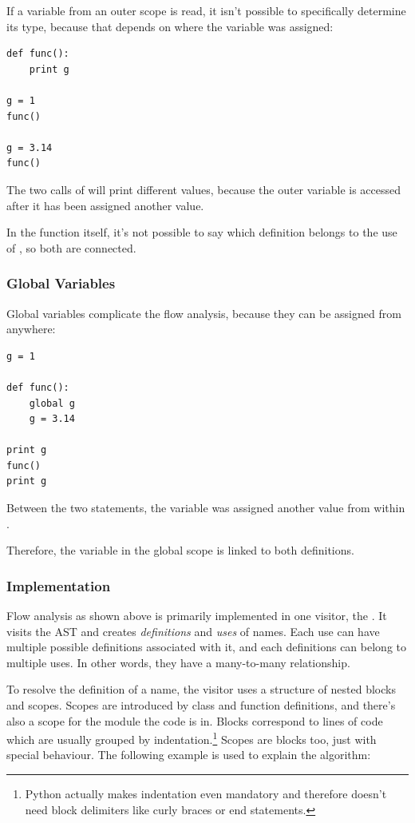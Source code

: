 \documentclass[12pt,halfparskip,DIV11,BCOR10mm]{scrreprt}
\begin{document}
If a variable from an outer scope is read, it isn't possible to specifically determine its type, because that depends on where the variable was assigned:

\begin{lstlisting}
def func():
    print g

g = 1
func()

g = 3.14
func()
\end{lstlisting}

The two calls of  will print different values, because the outer variable  is accessed after it has been assigned another value. 

In the function itself, it's not possible to say which definition belongs to the use of , so both are connected.

\subsubsection{Global Variables}

Global variables complicate the flow analysis, because they can be assigned from anywhere:

\begin{lstlisting}
g = 1

def func():
    global g
    g = 3.14

print g
func()
print g
\end{lstlisting}

Between the two  statements, the variable  was assigned another value from within . 

Therefore, the variable  in the global scope is linked to both definitions.

\subsubsection{Implementation}

Flow analysis as shown above is primarily implemented in one visitor, the . It visits the AST and creates \emph{definitions} and \emph{uses} of names. Each use can have multiple possible definitions associated with it, and each definitions can belong to multiple uses. In other words, they have a many-to-many relationship.

To resolve the definition of a name, the visitor uses a structure of nested blocks and scopes. Scopes are introduced by class and function definitions, and there's also a scope for the module the code is in. Blocks correspond to lines of code which are usually grouped by indentation.\footnote{Python actually makes indentation even mandatory and therefore doesn't need block delimiters like curly braces or end statements.} Scopes are blocks too, just with special behaviour. The following example is used to explain the algorithm:
\end{document}
